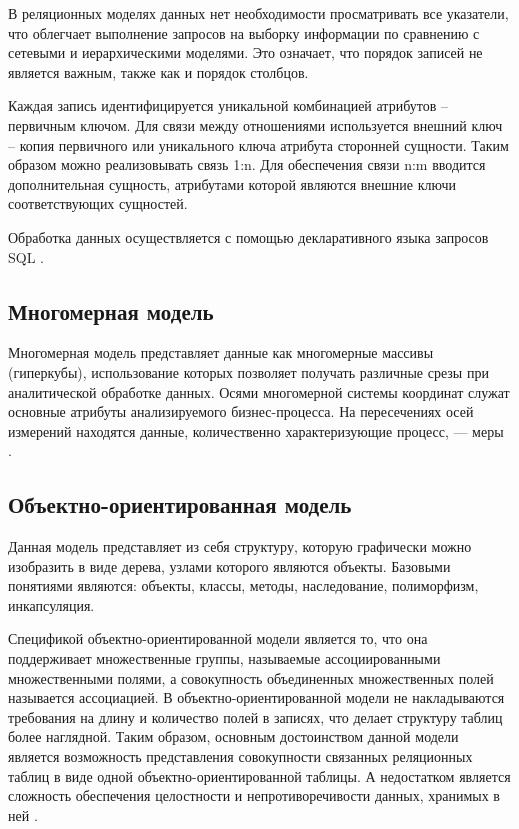 В реляционных моделях данных нет необходимости просматривать все указатели, что облегчает выполнение запросов на выборку информации по сравнению с сетевыми и иерархическими моделями. Это означает, что порядок записей не является важным, также как и порядок столбцов.

Каждая запись идентифицируется уникальной комбинацией атрибутов -- первичным ключом. Для связи между отношениями используется внешний ключ -- копия первичного или уникального ключа атрибута сторонней сущности. Таким образом можно реализовывать связь 1:n. Для обеспечения связи n:m вводится дополнительная сущность, атрибутами которой являются внешние ключи соответствующих сущностей.

Обработка данных осуществляется с помощью декларативного языка запросов SQL \cite{sql}. 

\subsection{Многомерная модель} Многомерная модель представляет данные как многомерные массивы (гиперкубы), использование которых позволяет получать различные срезы при аналитической обработке данных. Осями многомерной системы координат служат основные атрибуты анализируемого бизнес-процесса. На пересечениях осей измерений находятся данные, количественно характеризующие процесс, — меры \cite{postrel}.

\subsection{Объектно-ориентированная модель} Данная модель представляет из себя структуру, которую графически можно изобразить в виде дерева, узлами которого являются объекты. Базовыми понятиями являются: объекты, классы, методы, наследование, полиморфизм, инкапсуляция.

Спецификой объектно-ориентированной модели является то, что она поддерживает множественные группы, называемые ассоциированными множественными полями, а совокупность объединенных множественных полей называется ассоциацией. В объектно-ориентированной модели не накладываются требования на длину и количество полей в записях, что делает структуру таблиц более наглядной.
Таким образом, основным достоинством данной модели является возможность представления совокупности связанных реляционных таблиц в виде одной объектно-ориентированной таблицы. А недостатком является сложность обеспечения целостности и непротиворечивости данных, хранимых в ней \cite{postrel}. 

